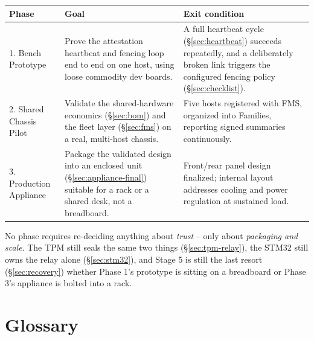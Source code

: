 \documentclass[11pt,a4paper]{article}
\begin{document}
\begin{center}
\renewcommand{\arraystretch}{1.35}
\small
\begin{tabular}{@{}p{2.4cm}p{6.3cm}p{5.6cm}@{}}
\toprule
\textbf{Phase} & \textbf{Goal} & \textbf{Exit condition} \\
\midrule
1. Bench Prototype & Prove the attestation heartbeat and fencing loop
end to end on one host, using loose commodity dev boards. & A full
heartbeat cycle (\S\ref{sec:heartbeat}) succeeds repeatedly, and a
deliberately broken link triggers the configured fencing policy
(\S\ref{sec:checklist}). \\
2. Shared Chassis Pilot & Validate the shared-hardware economics
(\S\ref{sec:bom}) and the fleet layer (\S\ref{sec:fms}) on a real,
multi-host chassis. & Five hosts registered with FMS, organized into
Families, reporting signed summaries continuously. \\
3. Production Appliance & Package the validated design into an
enclosed unit (\S\ref{sec:appliance-final}) suitable for a rack or a
shared desk, not a breadboard. & Front/rear panel design finalized;
internal layout addresses cooling and power regulation at sustained
load. \\
\bottomrule
\end{tabular}
\end{center}

\begin{plainbox}
No phase requires re-deciding anything about \emph{trust} -- only about
\emph{packaging and scale}. The TPM still seals the same two things
(\S\ref{sec:tpm-relay}), the STM32 still owns the relay alone
(\S\ref{sec:stm32}), and Stage 5 is still the last resort
(\S\ref{sec:recovery}) whether Phase 1's prototype is sitting on a
breadboard or Phase 3's appliance is bolted into a rack.
\end{plainbox}

\section{Glossary}
\end{document}
